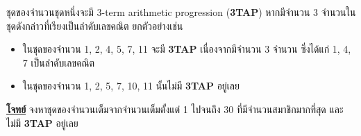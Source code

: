\question{}

ชุดของจำนวนชุดหนึ่งจะมี 3-term arithmetic progression (\textbf{3TAP})
หากมีจำนวน 3 จำนวนในชุดดังกล่าวที่เรียงเป็นลำดับเลขคณิต\; ยกตัวอย่างเช่น
\begin{itemize}[before*=\small]
\item ในชุดของจำนวน 1, 2, 4, 5,  7, 11 จะมี \textbf{3TAP} เนื่องจากมีจำนวน 3 จำนวน ซึ่งได้แก่ 1, 4, 7 เป็นลำดับเลขคณิต
\item ในชุดของจำนวน 1, 2, 5, 7, 10, 11 นั้นไม่มี \textbf{3TAP} อยู่เลย
\end{itemize}

\noindent
\textbf{\uline{โจทย์}} จงหาชุดของจำนวนเต็มจากจำนวนเต็มตั้งแต่ 1 ไปจนถึง 30 ที่มีจำนวนสมาชิกมากที่สุด 
และไม่มี \textbf{3TAP} อยู่เลย
